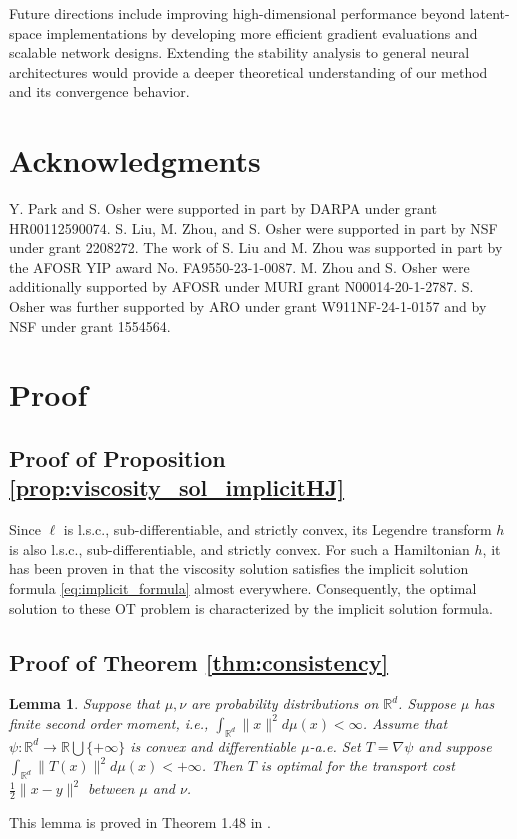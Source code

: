 \documentclass{article} %
\theoremstyle{plain}
\newtheorem{lemma}[theorem]{Lemma}
\theoremstyle{definition}
\theoremstyle{remark}
\begin{document}
Future directions include improving high-dimensional performance beyond latent-space implementations by developing more efficient gradient evaluations and scalable network designs. Extending the stability analysis to general neural architectures would provide a deeper theoretical understanding of our method and its convergence behavior.

\section{Acknowledgments}
Y. Park and S. Osher were supported in part by DARPA under grant HR00112590074. S. Liu, M. Zhou, and S. Osher were supported in part by NSF under grant 2208272. The work of S. Liu and M. Zhou was supported in part by the AFOSR YIP award No. FA9550-23-1-0087. M. Zhou and S. Osher were additionally supported by AFOSR under MURI grant N00014-20-1-2787. S. Osher was further supported by ARO under grant W911NF-24-1-0157 and by NSF under grant 1554564.




\appendix

\section{Proof}
\subsection{Proof of Proposition \ref{prop:viscosity_sol_implicitHJ}}\label{appen:pf_prop_viscosity_sol_implicitHJ}

Since $\ell$ is l.s.c., sub-differentiable, and strictly convex, its Legendre transform $h$ is also l.s.c., sub-differentiable, and strictly convex. For such a Hamiltonian $h$, it has been proven in \citep{park2025implicit} that the viscosity solution satisfies the implicit solution formula \eqref{eq:implicit_formula} almost everywhere. Consequently, the optimal solution to these OT problem is characterized by the implicit solution formula. 


\subsection{Proof of Theorem \ref{thm:consistency}}\label{appen:thm_consistency}
\begin{lemma}\label{lemma:sufficient_cond_for_OT} 
  Suppose that $\mu, \nu$ are probability distributions on $\mathbb{R}^d$. Suppose $\mu$ has finite second order moment, i.e.,  $\int_{\mathbb{R}^d} \|x\|^2 d\mu(x) < \infty$. Assume that $\psi:\mathbb{R}^d \rightarrow \mathbb{R}\bigcup \{+\infty \}$ is convex and differentiable $\mu$-a.e. Set $T = \nabla \psi$ and suppose $\int_{\mathbb{R}^d} \|T(x)\|^2 d\mu(x) < + \infty$. Then $T$ is optimal for the transport cost $\frac12 \|x - y\|^2$ between $\mu$ and $\nu$. 
\end{lemma}
This lemma is proved in Theorem 1.48 in \cite{santambrogio2015optimal}.
\end{document}
